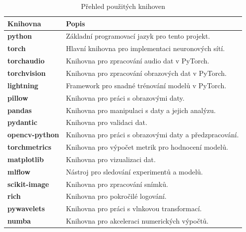 \documentclass[male,czech,api_ing]{thesis}
\begin{document}
\begin{table}[H]
    \centering
    \begin{tabular}{|l|l|}
    \hline
    \textbf{Knihovna}       & \textbf{Popis}                                          \\ \hline
    \textbf{python}         & Základní programovací jazyk pro tento projekt.          \\ \hline
    \textbf{torch}          & Hlavní knihovna pro implementaci neuronových sítí.      \\ \hline
    \textbf{torchaudio}     & Knihovna pro zpracování audio dat v PyTorch.            \\ \hline
    \textbf{torchvision}    & Knihovna pro zpracování obrazových dat v PyTorch.       \\ \hline
    \textbf{lightning}      & Framework pro snadné trénování modelů v PyTorch.        \\ \hline
    \textbf{pillow}         & Knihovna pro práci s obrazovými daty.                   \\ \hline
    \textbf{pandas}         & Knihovna pro manipulaci s daty a jejich analýzu.        \\ \hline
    \textbf{pydantic}       & Knihovna pro validaci dat.                              \\ \hline
    \textbf{opencv-python}  & Knihovna pro práci s obrazovými daty a předzpracování.  \\ \hline
    \textbf{torchmetrics}   & Knihovna pro výpočet metrik pro hodnocení modelů.       \\ \hline
    \textbf{matplotlib}     & Knihovna pro vizualizaci dat.                           \\ \hline
    \textbf{mlflow}         & Nástroj pro sledování experimentů a modelů.             \\ \hline
    \textbf{scikit-image}   & Knihovna pro zpracování snímků.                         \\ \hline
    \textbf{rich}           & Knihovna pro pokročilé logování.                        \\ \hline
    \textbf{pywavelets}     & Knihovna pro práci s vlnkovou transformací.             \\ \hline
    \textbf{numba}          & Knihovna pro akceleraci numerických výpočtů.            \\ \hline
    \end{tabular}
    \caption{Přehled použitých knihoven}
    \label{tab:Used_libs}
\end{table}
\end{document}
